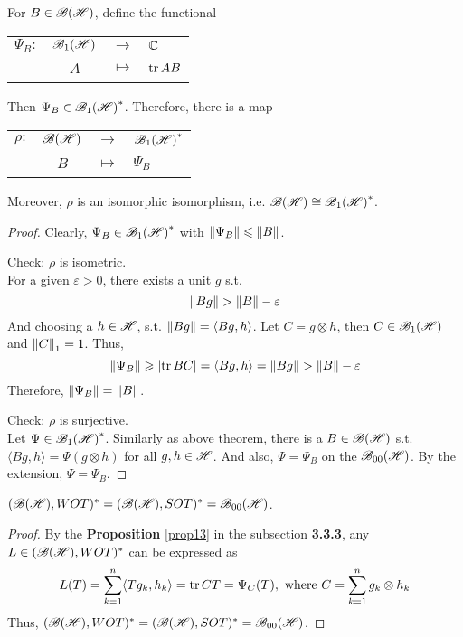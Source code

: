 \begin{thm}
	For $B \in \mathscr{B(H)}$, define the functional
	\begin{center}
		\begin{tabular}{l c c l}
			$\Psi_B \colon$ & $\mathscr{B}_{1}\mathscr{(H)}$ & $\longrightarrow$ & $\mathbb{C}$ \\
			~ & $A$ & $\longmapsto$ & $\operatorname{tr}{AB}$
		\end{tabular}
	\end{center}
	Then $\Psi_B \in \mathscr{B}_{1}\mathscr{(H)}^{*}$. Therefore, there is a map
	\begin{center}
		\begin{tabular}{l c c l}
			$\rho \colon$ & $\mathscr{B(H)}$ & $\longrightarrow$ & $\mathscr{B}_{1}\mathscr{(H)}^{*}$ \\
			~ & $B$ & $\longmapsto$ & $\Psi_B$
		\end{tabular}
	\end{center}
	Moreover, $\rho$ is an isomorphic isomorphism, i.e. $\mathscr{B(H)} \cong \mathscr{B}_{1}\mathscr{(H)}^{*}$. 
\end{thm}
\begin{proof}
	Clearly, $\Psi_B \in \mathscr{B}_{1}\mathscr{(H)}^{*}$ with $\left\lVert\Psi_B\right\lVert \leqslant \left\lVert B\right\lVert$.
	\item Check: $\rho$ is isometric. \\
	For a given $\varepsilon > 0$, there exists a unit $g$ s.t. 
	\begin{equation*}
		\left\lVert Bg\right\lVert > \left\lVert B\right\lVert-\varepsilon
	\end{equation*}
	And choosing a $h \in \mathscr{H}$, s.t. $\left\lVert Bg\right\lVert = \langle Bg,h \rangle$. Let $C = g \otimes h$, then $C \in \mathscr{B}_{1}\mathscr{(H)}$ and $\left\lVert C\right\lVert_1 = 1$.  Thus,
	\begin{equation*}
		\left\lVert\Psi_B\right\lVert \geqslant \left\lvert\operatorname{tr}{BC}\right\lvert = \langle Bg,h \rangle = \left\lVert Bg\right\lVert > \left\lVert B\right\lVert-\varepsilon
	\end{equation*}
	Therefore, $\left\lVert\Psi_B\right\lVert = \left\lVert B\right\lVert$.
	\item Check: $\rho$ is surjective.\\
	Let $\Psi \in \mathscr{B}_{1}\mathscr{(H)}^{*}$. Similarly as above theorem, there is a $B \in \mathscr{B(H)}$ s.t. $\langle Bg,h \rangle = \Psi(g \otimes h)$ for all $g,h \in \mathscr{H}$. And also, $\Psi = \Psi_B$ on the $\mathscr{B}_{00}\mathscr{(H)}$. By the extension, $\Psi = \Psi_B$.
\end{proof}

\begin{thm}
	$(\mathscr{B(H)}, WOT)^{*} = (\mathscr{B(H)}, SOT)^{*} = \mathscr{B}_{00}\mathscr{(H)}$.
\end{thm}
\begin{proof}
	By the \textbf{Proposition} \ref{prop13} in the subsection \textbf{3.3.3}, any $L \in (\mathscr{B(H)}, WOT)^{*}$ can be expressed as
	\begin{equation*}
		L(T) = \sum_{k=1}^n \langle Tg_k, h_k \rangle = \operatorname{tr}{CT} = \Psi_C(T), \text{ where } C = \sum_{k=1}^n g_k \otimes h_k
	\end{equation*}
	Thus, $(\mathscr{B(H)}, WOT)^{*} = (\mathscr{B(H)}, SOT)^{*} = \mathscr{B}_{00}\mathscr{(H)}$.
\end{proof}

